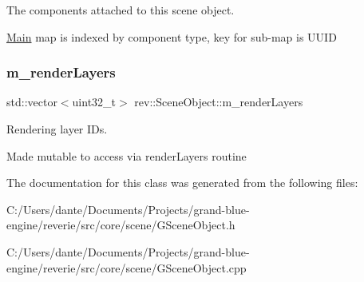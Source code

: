 The components attached to this scene object. 

\mbox{\hyperlink{class_main}{Main}} map is indexed by component type, key for sub-\/map is U\+U\+ID \mbox{\label{classrev_1_1_scene_object_a70ef7a7bc84a8565aa2fb6d30253019e}} 
\subsubsection{\texorpdfstring{m\_renderLayers}{m\_renderLayers}}
{\footnotesize\ttfamily std\+::vector$<$uint32\+\_\+t$>$ rev\+::\+Scene\+Object\+::m\+\_\+render\+Layers\hspace{0.3cm}{\ttfamily [protected]}}



Rendering layer I\+Ds. 

Made mutable to access via render\+Layers routine 

The documentation for this class was generated from the following files\+:\begin{DoxyCompactItemize}
\item 
C\+:/\+Users/dante/\+Documents/\+Projects/grand-\/blue-\/engine/reverie/src/core/scene/G\+Scene\+Object.\+h\item 
C\+:/\+Users/dante/\+Documents/\+Projects/grand-\/blue-\/engine/reverie/src/core/scene/G\+Scene\+Object.\+cpp\end{DoxyCompactItemize}
